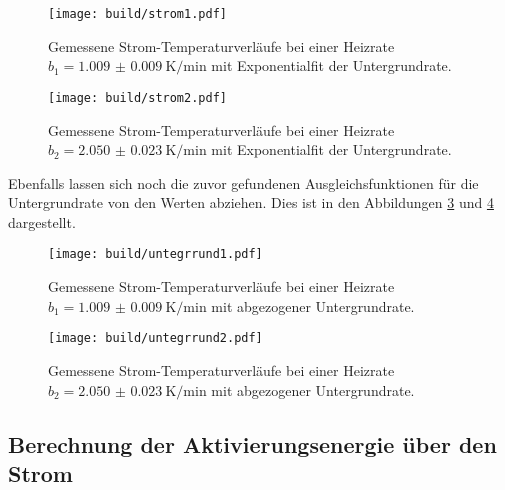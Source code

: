 \begin{figure}
    \centering
    \texttt{[image: build/strom1.pdf]}
    \caption{Gemessene Strom-Temperaturverläufe bei einer Heizrate \newline $ b_1 = \SI{1.009(9)}{\kelvin\per\minute}$ mit Exponentialfit der Untergrundrate.
            }
    \label{fig:a2}
\end{figure}
\begin{figure}
    \centering
    \texttt{[image: build/strom2.pdf]}
    \caption{Gemessene Strom-Temperaturverläufe bei einer Heizrate \newline $b_2 = \SI{2.050(23)}{\kelvin\per\minute}$ mit Exponentialfit der Untergrundrate.
            }
    \label{fig:a3}
\end{figure}
Ebenfalls lassen sich noch die zuvor gefundenen Ausgleichsfunktionen für die Untergrundrate von den Werten abziehen. Dies ist in den Abbildungen \ref{fig:b1} und \ref{fig:b2}
dargestellt.
\begin{figure}
    \centering
    \texttt{[image: build/untegrrund1.pdf]}
    \caption{Gemessene Strom-Temperaturverläufe bei einer Heizrate \newline $ b_1 = \SI{1.009(9)}{\kelvin\per\minute}$ mit abgezogener Untergrundrate.
            }
    \label{fig:b1}
\end{figure}
\begin{figure}
    \centering
    \texttt{[image: build/untegrrund2.pdf]}
    \caption{Gemessene Strom-Temperaturverläufe bei einer Heizrate \newline $b_2 = \SI{2.050(23)}{\kelvin\per\minute}$ mit abgezogener Untergrundrate.
            }
    \label{fig:b2}
\end{figure}
\subsection{Berechnung der Aktivierungsenergie über den Strom} 

